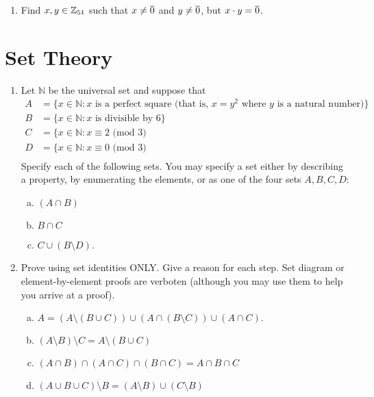 \begin{enumerate}
\item
Find $x,y \in \mathbb{Z}_{51}$ such that $x \neq \overline{0}$ and $y \neq \overline{0}$, but $x \cdot y = \overline{0}$.


\end{enumerate}


\section{Set Theory}

\begin{enumerate}

\item
Let ${\mathbb N}$ be the universal set and suppose that
\begin{align*}
A &= \{ x \in {\mathbb N} : x \text{ is a perfect square (that is, } x=y^2 \text{ where } y \text{ is a natural number)}\} \\ 
B &= \{ x \in {\mathbb N} : x \text{ is divisible by 6}\} \\ 
C &= \{ x \in {\mathbb N} : x  \equiv 2 \text{ (mod 3)} \\
D &= \{ x \in {\mathbb N} : x  \equiv 0 \text{ (mod 3)} \\
\end{align*} 
Specify each of the following sets. You may specify a set either by describing a property, by enumerating the elements, or as one of the four sets $A, B, C, D$:
\begin{enumerate}[(a)]
\item
$(A \cap B)$
\item
$B \cap C$
\item
$C \cup (B \setminus D)$.
\end{enumerate}



\item
Prove using set identities ONLY. Give a reason for each step. Set diagram or element-by-element proofs are verboten (although you may use them to help you arrive at a proof).
\begin{enumerate}[(a)]
\item
$A = (A\setminus (B\cup C)) \cup (A\cap (B\setminus C)) \cup  (A \cap C).$
\item
$(A \setminus B) \setminus C = A \setminus( B \cup C) $
\item
$(A \cap B) \cap (A \cap C) \cap (B \cap C) = A \cap B \cap C$
\item
$(A \cup B \cup C) \setminus B = (A \setminus B) \cup (C \setminus B)$
\end{enumerate}


\end{enumerate}
